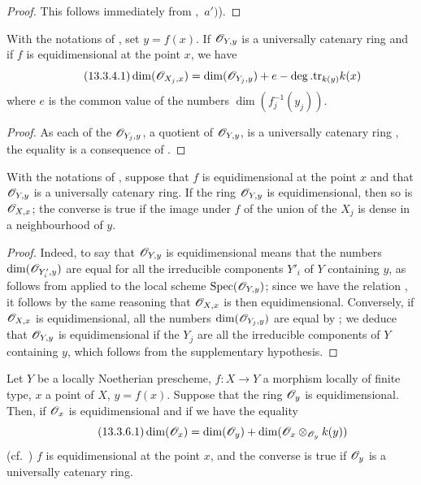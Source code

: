 \begin{proof}
This follows immediately from ,~$a')$).
\end{proof}

\begin{corollary}[13.3.4]
\label{IV.13.3.4}
With the notations of , set $y=f(x)$.
If $\mathscr{O}_{Y,y}$ is a universally catenary ring and if $f$ is equidimensional at the point $x$, we have
\[
\tag{13.3.4.1}
\label{IV.13.3.4.1}
  \dim(\mathscr{O}_{X_j,x})=\dim(\mathscr{O}_{Y_j,y})+e-\deg.\mathrm{tr}_{k(y)}k(x)
\]
where $e$ is the common value of the numbers $\dim(f_j^{-1}(y_j))$.
\end{corollary}

\begin{proof}
As each of the $\mathscr{O}_{Y_j,y}$, a quotient of $\mathscr{O}_{Y,y}$, is a universally catenary ring , the equality is a consequence of .
\end{proof}

\begin{corollary}[13.3.5]
\label{IV.13.3.5}
With the notations of , suppose that $f$ is equidimensional at the point $x$ and that $\mathscr{O}_{Y,y}$ is a universally catenary ring.
If the ring $\mathscr{O}_{Y,y}$ is equidimensional, then so is $\mathscr{O}_{X,x}$; the converse is true if the image under $f$ of the union of the $X_j$ is dense in a neighbourhood of $y$.
\end{corollary}

\begin{proof}
Indeed, to say that $\mathscr{O}_{Y,y}$ is equidimensional means that the numbers $\dim(\mathscr{O}_{Y'_i,y})$ are equal for all the irreducible components $Y'_i$ of $Y$ containing $y$, as follows from  applied to the local scheme $\operatorname{Spec}(\mathscr{O}_{Y,y})$; since we have the relation , it follows by the same reasoning that $\mathscr{O}_{X,x}$ is then equidimensional.
Conversely, if $\mathscr{O}_{X,x}$ is equidimensional, all the numbers $\dim(\mathscr{O}_{Y_j,y})$ are equal by ; we deduce that $\mathscr{O}_{Y,y}$ is equidimensional if the $Y_j$ are all the irreducible components of $Y$ containing $y$, which follows from the supplementary hypothesis.
\end{proof}

\begin{proposition}[13.3.6]
\label{IV.13.3.6}
Let $Y$ be a locally Noetherian prescheme, $f:X\to Y$ a morphism locally of finite type, $x$ a point of $X$, $y=f(x)$.
Suppose that the ring $\mathscr{O}_y$ is equidimensional. Then, if $\mathscr{O}_x$ is equidimensional and if we have the equality
\[
\tag{13.3.6.1}
\label{IV.13.3.6.1}
  \dim(\mathscr{O}_x)=\dim(\mathscr{O}_y)+\dim(\mathscr{O}_x\otimes_{\mathscr{O}_y}k(y))
\]
(cf.\ ) $f$ is equidimensional at the point $x$, and the converse is true if $\mathscr{O}_y$ is a universally catenary ring.
\end{proposition}

